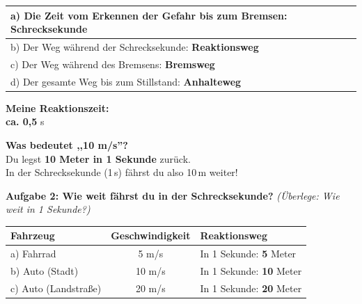 \documentclass[11pt,a4paper]{article}
\newcommand{\aufgabe}[1]{\textbf{\textcolor{physik}{#1}}}
\newcommand{\lsg}[1]{\textcolor{loesung}{\textbf{#1}}}
\begin{document}
\vspace{0.3em}
\renewcommand{\arraystretch}{1.6}
\begin{tabularx}{\textwidth}{|X|}
\hline
a) Die Zeit vom Erkennen der Gefahr bis zum Bremsen: \lsg{Schrecksekunde} \\
\hline
b) Der Weg während der Schrecksekunde: \lsg{Reaktionsweg} \\
\hline
c) Der Weg während des Bremsens: \lsg{Bremsweg} \\
\hline
d) Der gesamte Weg bis zum Stillstand: \lsg{Anhalteweg} \\
\hline
\end{tabularx}

\vspace{0.4em}

\noindent
\begin{minipage}[t]{0.35\textwidth}
\begin{merkbox}
\centering
\textbf{Meine Reaktionszeit:}\\[0.2em]
{\Large \lsg{ca. 0,5} s}
\end{merkbox}
\end{minipage}
\hfill
\begin{minipage}[t]{0.62\textwidth}
\begin{beispielbox}
\textbf{Was bedeutet ,,10 m/s''?}\\[0.2em]
Du legst \textbf{10 Meter in 1 Sekunde} zurück.\\
In der Schrecksekunde (1\,s) fährst du also 10\,m weiter!
\end{beispielbox}
\end{minipage}

\vspace{0.5em}

\aufgabe{Aufgabe 2: Wie weit fährst du in der Schrecksekunde?} \textit{(Überlege: Wie weit in 1 Sekunde?)}

\vspace{0.3em}
\renewcommand{\arraystretch}{1.8}
\begin{tabularx}{\textwidth}{|l|c|X|}
\hline
\textbf{Fahrzeug} & \textbf{Geschwindigkeit} & \textbf{Reaktionsweg} \\
\hline
a) Fahrrad & 5 m/s & In 1 Sekunde: \lsg{5} Meter \\
\hline
b) Auto (Stadt) & 10 m/s & In 1 Sekunde: \lsg{10} Meter \\
\hline
c) Auto (Landstraße) & 20 m/s & In 1 Sekunde: \lsg{20} Meter \\
\hline
\end{tabularx}
\end{document}
